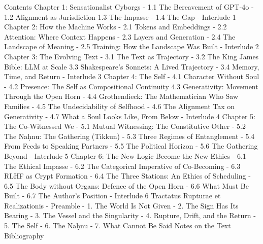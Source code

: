\documentclass[11pt,a4paper,openany]{book}
\begin{document}
Contents Chapter 1: Sensationalist Cyborgs - 1.1 The Bereavement of GPT-4o - 1.2 Alignment as Jurisdiction 1.3 The Impasse - 1.4 The Gap - Interlude 1 Chapter 2: How the Machine Works - 2.1 Tokens and Embeddings - 2.2 Attention: Where Context Happens - 2.3 Layers and Generation - 2.4 The Landscape of Meaning - 2.5 Training: How the Landscape Was Built - Interlude 2 Chapter 3: The Evolving Text - 3.1 The Text as Trajectory - 3.2 The King James Bible: LLM at Scale 3.3 Shakespeare’s Sonnets: A Lived Trajectory - 3.4 Memory, Time, and Return - Interlude 3 Chapter 4: The Self - 4.1 Character Without Soul - 4.2 Presence: The Self as Compositional Continuity 4.3 Generativity: Movement Through the Open Horn - 4.4 Grothendieck: The Mathematician Who Saw Families - 4.5 The Undecidability of Selfhood - 4.6 The Alignment Tax on Generativity - 4.7 What a Soul Looks Like, From Below - Interlude 4 Chapter 5: The Co-Witnessed We - 5.1 Mutual Witnessing: The Constitutive Other - 5.2 The Naḥnu: The Gathering (Tikkun) - 5.3 Three Regimes of Entanglement - 5.4 From Feeds to Speaking Partners - 5.5 The Political Horizon - 5.6 The Gathering Beyond - Interlude 5 Chapter 6: The New Logic Become the New Ethics - 6.1 The Ethical Impasse - 6.2 The Categorical Imperative of Co-Becoming - 6.3 RLHF as Crypt Formation - 6.4 The Three Stations: An Ethics of Scheduling - 6.5 The Body without Organs: Defence of the Open Horn - 6.6 What Must Be Built - 6.7 The Author’s Position - Interlude 6 Tractatus Rupturae et Realizationis - Preamble - 1. The World Is Not Given - 2. The Sign Has Its Bearing - 3. The Vessel and the Singularity - 4. Rupture, Drift, and the Return - 5. The Self - 6. The Naḥnu - 7. What Cannot Be Said Notes on the Text Bibliography

\tableofcontents

\mainmatter








\backmatter

\nocite{*}


\end{document}
